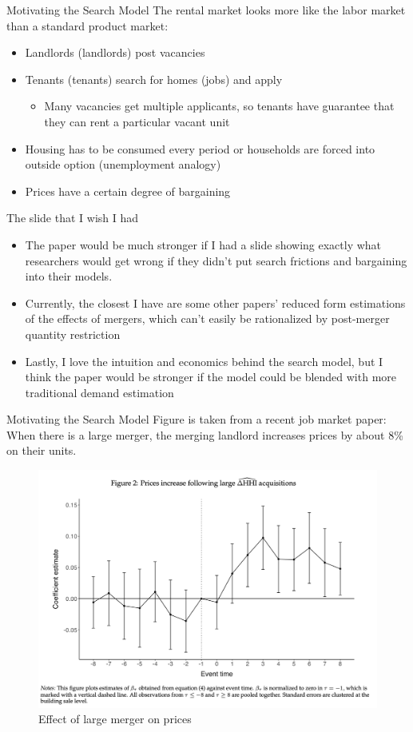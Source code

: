 \documentclass[10pt, xcolor=dvipsnames]{beamer}
\begin{document}
\begin{frame}{Motivating the Search Model}
The rental market looks more like the labor market than a standard product market:\\
    \begin{itemize}
        \item Landlords (landlords) post vacancies
        \item Tenants (tenants) search for homes (jobs) and apply
        \begin{itemize}
            \item Many vacancies get multiple applicants, so tenants have guarantee that they can rent a particular vacant unit
        \end{itemize}
        \item Housing has to be consumed every period or households are forced into outside option (unemployment analogy)
        \item Prices have a certain degree of bargaining
    \end{itemize}
    
\end{frame}

\begin{frame}{The slide that I wish I had}

\begin{itemize}
    \item The paper would be much stronger if I had a slide showing exactly what researchers would get wrong if they didn't put search frictions and bargaining into their models.
    \item Currently, the closest I have are some other papers' reduced form estimations of the effects of mergers, which can't easily be rationalized by post-merger quantity restriction
    \item Lastly, I love the intuition and economics behind the search model, but I think the paper would be stronger if the model could be blended with more traditional demand estimation
\end{itemize}
    
\end{frame}

\begin{frame}{Motivating the Search Model}
Figure is taken from a recent job market paper: When there is a large merger, the merging landlord increases prices by about 8\% on their units.
    \begin{figure}
        \centering
        \includegraphics[width=0.5\linewidth]{figs/fern-jmp-prices.png}
        \caption{Effect of large merger on prices}
        \label{fig:fern-prices}
    \end{figure}
\end{frame}
\end{document}
